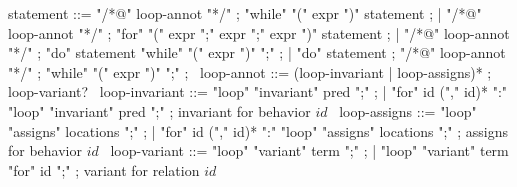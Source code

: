 \begin{syntax}
  statement ::= "/*@" loop-annot "*/" ;
  "while" "(" expr ")" statement ;
  | "/*@" loop-annot "*/" ;
  "for" "(" expr ";" expr ";" expr ")" statement ;
  | "/*@" loop-annot "*/" ;
  "do" statement "while" "(" expr ")" ";" ;
  | "do" statement ;
  "/*@" loop-annot "*/" ;
  "while" "(" expr ")" ";" ; \experimental
  \
  loop-annot ::= (loop-invariant | loop-assigns)* ;
  loop-variant?
  \
  loop-invariant ::= "loop" "invariant" pred ";" ;
  | {"for" id ("," id)* ":" "loop" "invariant" pred ";"} ; invariant for behavior $id$
  \
  loop-assigns ::= "loop" "assigns" locations ";" ;
  | {"for" id ("," id)* ":" "loop" "assigns" locations ";"} ; assigns for behavior $id$
  \
  loop-variant ::= "loop" "variant" term ";" ;
  | "loop" "variant" term "for" id ";" ; variant for relation $id$
  \
\end{syntax}
